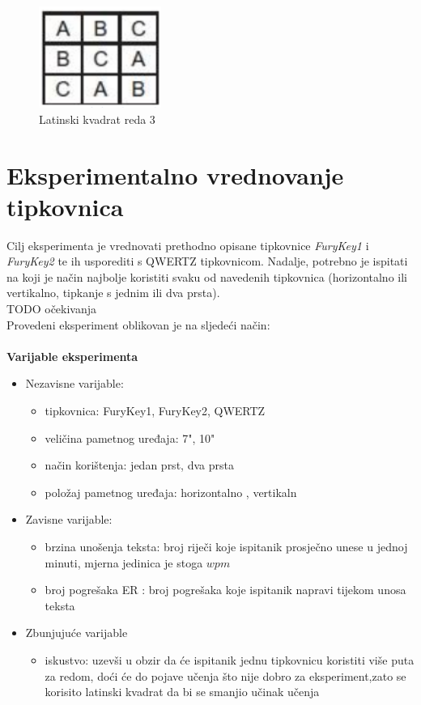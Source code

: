 \documentclass[times, utf8, zavrsni]{fer}
\begin{document}
\begin{figure}[htb]
\centering
\includegraphics[width=4cm]{img/latinski_kvadrat.png}
\caption{Latinski kvadrat reda 3}
\label{fig:latinski_kvadrat}
\end{figure}

\section{Eksperimentalno vrednovanje tipkovnica}
Cilj eksperimenta je vrednovati prethodno opisane tipkovnice \emph{FuryKey1} i \emph{FuryKey2} te ih usporediti s QWERTZ tipkovnicom. Nadalje, potrebno je ispitati na koji je način najbolje koristiti svaku od navedenih tipkovnica (horizontalno ili vertikalno, tipkanje s jednim ili dva prsta). \\TODO očekivanja \\
Provedeni eksperiment oblikovan je na sljedeći način:
\\\\\textbf{Varijable eksperimenta}
\begin{itemize}
\item Nezavisne varijable:
\begin{itemize}
\item tipkovnica: FuryKey1, FuryKey2, QWERTZ
\item veličina pametnog uređaja: 7", 10"
\item način korištenja: jedan prst, dva prsta
\item položaj pametnog uređaja: horizontalno , vertikaln 
\end{itemize}
\item Zavisne varijable:
\begin{itemize}
\item brzina unošenja teksta: broj riječi koje ispitanik prosječno unese u jednoj minuti, mjerna jedinica je stoga $wpm$ 
\item broj pogrešaka ER : broj pogrešaka koje ispitanik napravi tijekom unosa teksta
\end{itemize}
\item Zbunjujuće varijable
\begin{itemize}
\item iskustvo: uzevši u obzir da će ispitanik jednu tipkovnicu koristiti više puta za redom, doći će do pojave učenja što nije dobro za eksperiment,zato se korisito latinski kvadrat da bi se smanjio učinak učenja
\end{itemize}
\end{itemize}
\end{document}
